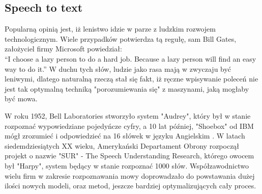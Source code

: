 \documentclass[12pt, a4paper]{article}
\begin{document}
\begin{sloppypar}
{  \subsection{Speech to text}
  {
    Popularną opinią jest, iż lenistwo idzie w parze z ludzkim rozwojem 
    technologicznym. Wiele przypadków potwierdza tą regułę, sam Bill Gates, założyciel
    firmy Microsoft powiedział:\\ 
    “I choose a lazy person to do a hard job. 
    Because a lazy person will find an easy way to do it.”
    W duchu tych słów, ludzie jako rasa mają w zwyczaju być leniwymi, dlatego
    naturalną rzeczą stał się fakt, iż ręczne wpisywanie poleceń nie jest tak 
    optymalną techniką "porozumiewania się" z maszynami, jaką mogłaby być mowa.
    
    W roku 1952, Bell Laboratories stworzyło system "Audrey", który był w stanie 
    rozpoznać wypowiedziane pojedyńcze cyfry, a 10 lat później, "Shoebox" od IBM
    mógł zrozumieć i odpowiedzieć na 16 słówek w języku Angielskim \cite{speech_history}.
    W latach siedemdziesiątych XX wieku, Amerykański Departament Obrony rozpoczął
    projekt o nazwie "SUR" - The Speech Understanding Research, którego owocem
    był "Harpy", system będący w stanie rozpoznać 1000 słów. Współzawodnictwo wielu
    firm w zakresie rozpoznawania mowy doprowadzało do powstawania dużej ilości nowych
    modeli, oraz metod, jeszcze bardziej optymalizujących cały proces.

}}
\end{sloppypar}
\end{document}
